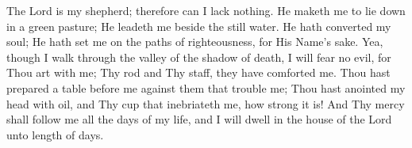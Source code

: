 The Lord is my shepherd; therefore can I lack nothing. He maketh me to lie down in a green pasture; He leadeth me beside the still water. He hath converted my soul; He hath set me on the paths of righteousness, for His Name’s sake. Yea, though I walk through the valley of the shadow of death, I will fear no evil, for Thou art with me; Thy rod and Thy staff, they have comforted me. Thou hast prepared a table before me against them that trouble me; Thou hast anointed my head with oil, and Thy cup that inebriateth me, how strong it is! And Thy mercy shall follow me all the days of my life, and I will dwell in the house of the Lord unto length of days.
